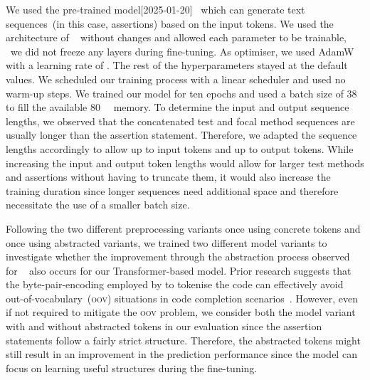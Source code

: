 We used the pre-trained \codetfivelarge
model[2025-01-20]~\cite{Le2022}
which can generate text sequences~(in this case, assertions) based on
the input tokens. We used the architecture of
\codetfivelarge~\cite{Le2022} without changes and allowed each
parameter to be trainable, \ie~we did not freeze any layers during
fine-tuning.
As optimiser, we used AdamW~\cite{Loshchilov2017} with a learning rate
of . The rest of the hyperparameters stayed at the default
values. We scheduled our training process with a linear scheduler and
used no warm-up steps.
We trained our model for ten epochs and used a batch size of 38 to
fill the available \qty[round-mode=none]{80}{\gibi\byte}
 memory.
To determine the input and output sequence lengths, we observed that
the concatenated test and focal method sequences are usually longer
than the assertion statement. Therefore, we adapted the sequence
lengths accordingly to allow up to  input tokens and up to
 output tokens.
While increasing the input and output token lengths would allow for
larger test methods and assertions without having to truncate them, it
would also increase the training duration since longer sequences need
additional  space and therefore necessitate the use of
a smaller batch size.



Following the two different preprocessing variants once using concrete
tokens and once using abstracted variants, we trained two different
model variants to investigate whether the improvement through the
abstraction process observed for \atlas~\cite{Watson2020} also occurs
for our Transformer-based model.
Prior research suggests that the byte-pair-encoding employed by
 to tokenise the code can effectively avoid
out-of-vocabulary~(\textsc{oov}) situations in code completion
scenarios~\cite{Karampatsis2020}.
However, even if not required to mitigate the \textsc{oov} problem, we
consider both the model variant with and without abstracted tokens in
our evaluation since the assertion statements follow a fairly strict
structure. Therefore, the abstracted tokens might still result in an
improvement in the prediction performance since the model can focus on
learning useful structures during the fine-tuning.




